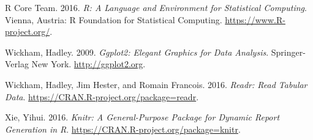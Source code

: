\documentclass[]{article}
\begin{document}
\hypertarget{ref-baseR}{}
R Core Team. 2016. \emph{R: A Language and Environment for Statistical
Computing}. Vienna, Austria: R Foundation for Statistical Computing.
\url{https://www.R-project.org/}.

\hypertarget{ref-ggplot2}{}
Wickham, Hadley. 2009. \emph{Ggplot2: Elegant Graphics for Data
Analysis}. Springer-Verlag New York. \url{http://ggplot2.org}.

\hypertarget{ref-readr}{}
Wickham, Hadley, Jim Hester, and Romain Francois. 2016. \emph{Readr:
Read Tabular Data}. \url{https://CRAN.R-project.org/package=readr}.

\hypertarget{ref-knitr}{}
Xie, Yihui. 2016. \emph{Knitr: A General-Purpose Package for Dynamic
Report Generation in R}. \url{https://CRAN.R-project.org/package=knitr}.
\end{document}
